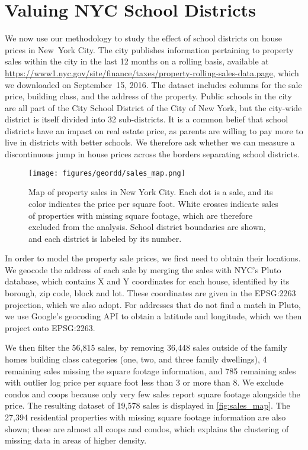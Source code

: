 \section{Valuing NYC School Districts}
\label{sec:NYC_example}

We now use our methodology to study the effect
of school districts on house prices in New~York City.
The city publishes information pertaining to property sales within the city in the last 12 months on a rolling basis,
available at \url{https://www1.nyc.gov/site/finance/taxes/property-rolling-sales-data.page},
which we downloaded on September~15, 2016.
The dataset includes columns for the sale price, building class, and the address of the property.
Public schools in the city are all part of the City School District of the City of New York, but the city-wide district is itself divided into 32 sub-districts.
It is a common belief that school districts have an impact on real estate price, as parents are willing to pay more to live in districts with better schools.
We therefore ask whether we can measure a discontinuous jump in house prices across the borders separating school districts.

\begin{figure}[tb]
    \centering
    \texttt{[image: figures/geordd/sales\_map.png]}
    \caption{\label{fig:sales_map}Map of property sales in New York City. Each dot is a sale, and its color indicates the price per square foot. White crosses indicate sales of properties with missing square footage, which are therefore excluded from the analysis. School district boundaries are shown, and each district is labeled by its number.}
\end{figure}

In order to model the property sale prices, we first need to obtain their locations.
We geocode the address of each sale by merging the sales with NYC's Pluto database, which contains X and Y coordinates for each house, identified by its borough, zip code, block and lot.
These coordinates are given in the EPSG:2263 projection, which we also adopt.
For addresses that do not find a match in Pluto, we use Google's geocoding API to obtain a latitude and longitude, which we then project onto EPSG:2263.

We then filter the 56,815 sales, by removing
36,448 sales outside of the family homes building class categories (one, two, and three family dwellings),
4 remaining sales missing the square footage information,
and 785 remaining sales with outlier log price per square foot less than 3 or more than 8.
We exclude condos and coops because only very few sales report square footage alongside the price.
The resulting dataset of 19,578 sales is displayed in \autoref{fig:sales_map}.
The 27,394 residential properties with missing square footage information are also shown;
these are almost all coops and condos, which explains the clustering of missing data in areas of higher density.


